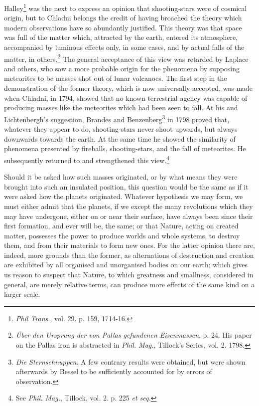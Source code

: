 \documentclass[a4paper, 12pt, oneside, polutonikogreek, english]{article}
\begin{document}
Halley\footnote{\emph{Phil Trans.}, vol. 29. p. 159, 1714-16.} was the next to express an opinion that shooting-stars were of cosmical origin, but to Chladni belongs the credit of having broached the theory which modern observations have so abundantly justified. This theory was that space was full of the matter which, attracted by the earth, entered its atmosphere, accompanied by luminous effects only, in some cases, and by actual falls of the matter, in others.\footnote{\emph{Über den Ursprung der von Pallas gefundenen Eisenmassen}, p. 24. His paper on the Pallas iron is abstracted in \emph{Phil. Mag.}, Tillock's Series, vol. 2. 1798.} The general acceptance of this view was retarded by Laplace and others, who saw a more probable origin for the phenomena by supposing meteorites to be masses shot out of lunar volcanoes. The first step in the demonstration of the former theory, which is now universally accepted, was made when Chladni, in 1794, showed that no known terrestrial agency was capable of producing masses like the meteorites which had been seen to fall. At his and Lichtenbergh's suggestion, Brandes and Benzenberg\footnote{\emph{Die Sternschnuppen}. A few contrary results were obtained, but were shown afterwards by Bessel to be sufficiently accounted for by errors of observation.} in 1798 proved that, whatever they appear to do, shooting-stars never shoot upwards, but always downwards towards the earth. At the same time he showed the similarity of phenomena presented by fireballs, shooting-stars, and the fall of meteorites. He subsequently returned to and strengthened this view.\footnote{See \emph{Phil. Mag.}, Tillock, vol. 2. p. 225 \emph{et seq.}}

Should it be asked how such masses originated, or by what means they were brought into such an insulated position, this question would be the same as if it were asked how the planets originated. Whatever hypothesis we may form, we must either admit that the planets, if we except the many revolutions which they may have undergone, either on or near their surface, have always been since their first formation, and ever will be, the same; or that Nature, acting on created matter, possesses the power to produce worlds and whole systems, to destroy them, and from their materials to form new ones. For the latter opinion there are, indeed, more grounds than the former, as alternations of destruction and creation are exhibited by all organised and unorganised bodies on our earth; which gives us reason to suspect that Nature, to which greatness and smallness, considered in general, are merely relative terms, can produce more effects of the same kind on a larger scale.
\end{document}
